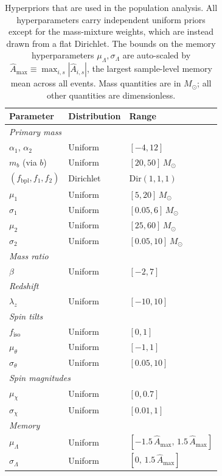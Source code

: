 \documentclass[aps,prd,reprint,twocolumn,10pt,eqsecnum,showpacs,nofootinbib,amsfonts,amssymb,amsmath,longbibliography,superscriptaddress,floatfix]{revtex4-1}
\begin{document}
\begin{table}[t]
	\caption{Hyperpriors that are used in the population analysis. All hyperparameters carry independent uniform priors except for the mass-mixture weights, which are instead drawn from a flat Dirichlet. The bounds on the memory hyperparameters $\mu_{\Lambda}, \sigma_{\Lambda}$ are auto-scaled by $\hat{A}_{\max} \equiv \max_{i, s} |\hat{A}_{i, s}|$, the largest sample-level memory mean across all events. Mass quantities are in $M_{\odot}$; all other quantities are dimensionless.}
	\label{tab:priors}
	\renewcommand{\arraystretch}{1.15}
	\begin{ruledtabular}
	\begin{tabular}{lll}
	Parameter & Distribution & Range \\
	\hline
	\multicolumn{3}{l}{\textit{Primary mass}} \\
	$\alpha_{1}$, $\alpha_{2}$ & Uniform & $[-4, 12]$ \\
	$m_{b}$ (via $b$) & Uniform & $[20, 50]\,M_{\odot}$ \\
	$(f_{\mathrm{bpl}}, f_{1}, f_{2})$ & Dirichlet & $\mathrm{Dir}(1, 1, 1)$ \\
	$\mu_{1}$ & Uniform & $[5, 20]\,M_{\odot}$ \\
	$\sigma_{1}$ & Uniform & $[0.05, 6]\,M_{\odot}$ \\
	$\mu_{2}$ & Uniform & $[25, 60]\,M_{\odot}$ \\
	$\sigma_{2}$ & Uniform & $[0.05, 10]\,M_{\odot}$ \\[2pt]
	\hline
	\multicolumn{3}{l}{\textit{Mass ratio}} \\
	$\beta$ & Uniform & $[-2, 7]$ \\[2pt]
	\hline
	\multicolumn{3}{l}{\textit{Redshift}} \\
	$\lambda_{z}$ & Uniform & $[-10, 10]$ \\[2pt]
	\hline
	\multicolumn{3}{l}{\textit{Spin tilts}} \\
	$f_{\mathrm{iso}}$ & Uniform & $[0, 1]$ \\
	$\mu_{\theta}$ & Uniform & $[-1, 1]$ \\
	$\sigma_{\theta}$ & Uniform & $[0.05, 10]$ \\[2pt]
	\hline
	\multicolumn{3}{l}{\textit{Spin magnitudes}} \\
	$\mu_{\chi}$ & Uniform & $[0, 0.7]$ \\
	$\sigma_{\chi}$ & Uniform & $[0.01, 1]$ \\[2pt]
	\hline
	\multicolumn{3}{l}{\textit{Memory}} \\
	$\mu_{\Lambda}$ & Uniform & $[-1.5\,\hat{A}_{\max},\, 1.5\,\hat{A}_{\max}]$ \\
	$\sigma_{\Lambda}$ & Uniform & $[0,\, 1.5\,\hat{A}_{\max}]$ \\
	\end{tabular}
	\end{ruledtabular}
	\end{table}	
\end{document}
